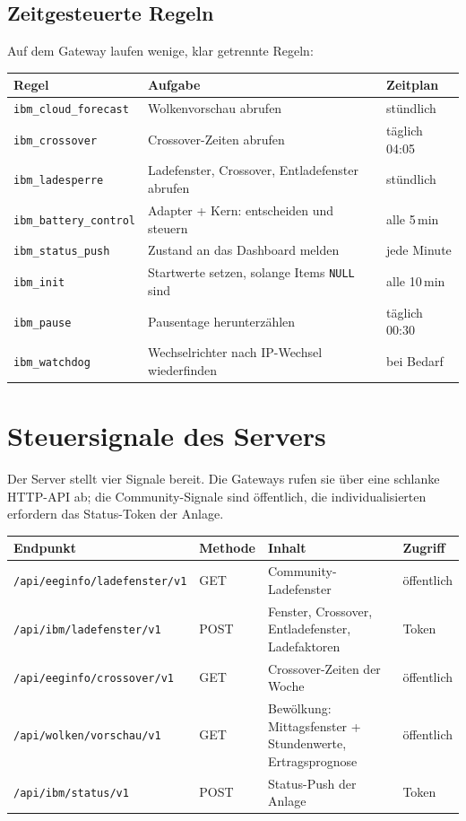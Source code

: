 \documentclass[11pt,a4paper]{article}
\newcommand{\code}[1]{\texttt{#1}}
\begin{document}
\subsection{Zeitgesteuerte Regeln}

Auf dem Gateway laufen wenige, klar getrennte Regeln:

\begin{center}
\small
\begin{tabular}{@{}lll@{}}
\toprule
Regel & Aufgabe & Zeitplan \\
\midrule
\code{ibm\_cloud\_forecast} & Wolkenvorschau abrufen & stündlich \\
\code{ibm\_crossover} & Crossover-Zeiten abrufen & täglich 04:05 \\
\code{ibm\_ladesperre} & Ladefenster, Crossover, Entladefenster abrufen & stündlich \\
\code{ibm\_battery\_control} & Adapter + Kern: entscheiden und steuern & alle 5\,min \\
\code{ibm\_status\_push} & Zustand an das Dashboard melden & jede Minute \\
\code{ibm\_init} & Startwerte setzen, solange Items \code{NULL} sind & alle 10\,min \\
\code{ibm\_pause} & Pausentage herunterzählen & täglich 00:30 \\
\code{ibm\_watchdog} & Wechselrichter nach IP-Wechsel wiederfinden & bei Bedarf \\
\bottomrule
\end{tabular}
\end{center}

\section{Steuersignale des Servers}\label{sec:signale}

Der Server stellt vier Signale bereit. Die Gateways rufen sie über eine
schlanke HTTP-API ab; die Community-Signale sind öffentlich, die
individualisierten erfordern das Status-Token der Anlage.

\begin{center}
\small
\begin{tabular}{@{}llll@{}}
\toprule
Endpunkt & Methode & Inhalt & Zugriff \\
\midrule
\code{/api/eeginfo/ladefenster/v1} & GET & Community-Ladefenster & öffentlich \\
\code{/api/ibm/ladefenster/v1} & POST & Fenster, Crossover, Entladefenster, Ladefaktoren & Token \\
\code{/api/eeginfo/crossover/v1} & GET & Crossover-Zeiten der Woche & öffentlich \\
\code{/api/wolken/vorschau/v1} & GET & Bewölkung: Mittagsfenster + Stundenwerte, Ertragsprognose & öffentlich \\
\code{/api/ibm/status/v1} & POST & Status-Push der Anlage & Token \\
\bottomrule
\end{tabular}
\end{center}
\end{document}

